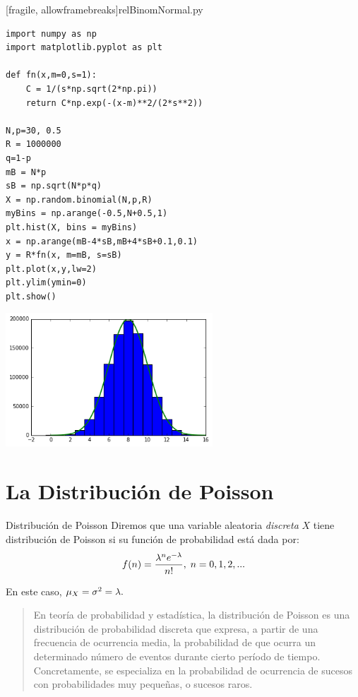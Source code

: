 [fragile, allowframebreaks]{relBinomNormal.py}
 \begin{verbatim}
import numpy as np
import matplotlib.pyplot as plt

def fn(x,m=0,s=1):
    C = 1/(s*np.sqrt(2*np.pi))
    return C*np.exp(-(x-m)**2/(2*s**2))

N,p=30, 0.5
R = 1000000
q=1-p
mB = N*p
sB = np.sqrt(N*p*q)
X = np.random.binomial(N,p,R)
myBins = np.arange(-0.5,N+0.5,1)
plt.hist(X, bins = myBins)
x = np.arange(mB-4*sB,mB+4*sB+0.1,0.1)
y = R*fn(x, m=mB, s=sB)
plt.plot(x,y,lw=2)
plt.ylim(ymin=0)
plt.show()
 \end{verbatim}
\begin{center}
 \includegraphics[height=5cm]{./pe/relBinNorm.png}
\end{center}



\section{La Distribución de Poisson}
{Distribución de Poisson} Diremos que una variable aleatoria \emph{discreta} $X$ tiene distribución de Poisson si su función de probabilidad está dada por:
 \begin{align}
  \label{eq:7.5}
  f(n)=\dfrac{\lambda^{n}e^{-\lambda}}{n!}, \; n=0,1,2,...
 \end{align}


En este caso, $\mu_{X}=\sigma^{2}=\lambda.$


\begin{quote}
 En teoría de probabilidad y estadística, la distribución de Poisson es una distribución de probabilidad discreta que expresa, a partir de una frecuencia de ocurrencia media, la probabilidad de que ocurra un determinado número de eventos durante cierto período de tiempo. Concretamente, se especializa en la probabilidad de ocurrencia de sucesos con probabilidades muy pequeñas, o sucesos raros.
\end{quote}

